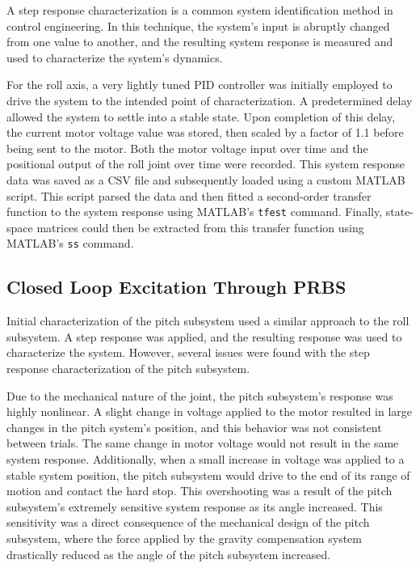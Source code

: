 A step response characterization is a common system identification method in control engineering. In this technique, the system's input is abruptly changed from one value to another, and the resulting system response is measured and used to characterize the system's dynamics.

For the roll axis, a very lightly tuned PID controller was initially employed to drive the system to the intended point of characterization. A predetermined delay allowed the system to settle into a stable state. Upon completion of this delay, the current motor voltage value was stored, then scaled by a factor of 1.1 before being sent to the motor. Both the motor voltage input over time and the positional output of the roll joint over time were recorded. This system response data was saved as a CSV file and subsequently loaded using a custom MATLAB script. This script parsed the data and then fitted a second-order transfer function to the system response using MATLAB's \texttt{tfest} command. Finally, state-space matrices could then be extracted from this transfer function using MATLAB's \texttt{ss} command.



\subsection{Closed Loop Excitation Through PRBS}

Initial characterization of the pitch subsystem used a similar approach to the roll subsystem. A step response was applied, and the resulting response was used to characterize the system. However, several issues were found with the step response characterization of the pitch subsystem.

Due to the mechanical nature of the joint, the pitch subsystem's response was highly nonlinear. A slight change in voltage applied to the motor resulted in large changes in the pitch system's position, and this behavior was not consistent between trials. The same change in motor voltage would not result in the same system response. Additionally, when a small increase in voltage was applied to a stable system position, the pitch subsystem would drive to the end of its range of motion and contact the hard stop. This overshooting was a result of the pitch subsystem's extremely sensitive system response as its angle increased. This sensitivity was a direct consequence of the mechanical design of the pitch subsystem, where the force applied by the gravity compensation system drastically reduced as the angle of the pitch subsystem increased.

